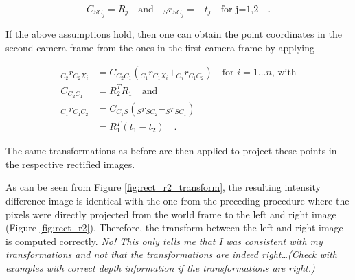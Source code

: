 \begin{equation}
  C_{SC_j} = R_j \hspace{1em} \text{and} \hspace{1em} _{S}r_{SC_j} = -t_j 
  \hspace{1em}\text{for j=1,2} \hspace{1em} \text{.}
  \label{rect/eqn:assumptions}
\end{equation}

If the above assumptions hold, then one can obtain the point coordinates in the second camera frame from the
ones in the first camera frame by applying

\begin{align}
  _{C_2}r_{C_2X_i} &= C_{C_2C_1} (_{C_1}r_{C_1X_i} + _{C_1}r_{C_1C_2}) 
  \hspace{1em} \text{for } i = 1 \ldots n \text{, with} \\ 
  C_{C_2C_1} &= R_2^TR_1 \hspace{1em} \text{and} \\
  _{C_1}r_{C_1C_2} &= C_{C_1 S} (_S{r}_{S C_2} - _S{r}_{S C_1}) \\
  &= R_1^T (t_1 - t_2)
  \hspace{1em} \text{.} 
\end{align}

The same transformations as before are then applied to project these points in
the respective rectified images. 

As can be seen from Figure \ref{fig:rect_r2_transform}, the resulting
intensity difference image is identical with the one from the preceding
procedure where the pixels were
directly projected from the world frame to the left and right image (Figure
\ref{fig:rect_r2}). 
Therefore, the transform between the left and right image is computed correctly.
\textit{No! This only tells me that I was consistent with my transformations and
not that the transformations are indeed right\ldots (Check with examples with
correct depth information if the transformations are right.)}

